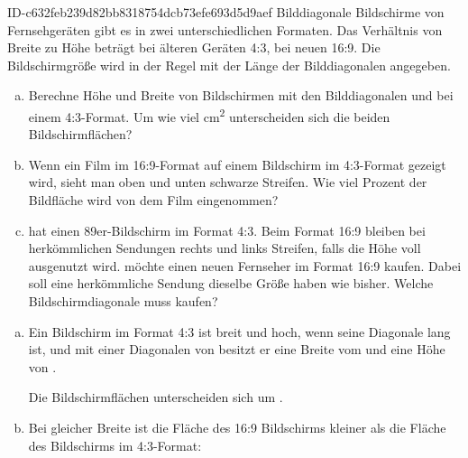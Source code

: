 \begin{exercise}
      {ID-c632feb239d82bb8318754dcb73efe693d5d9aef}
      {Bilddiagonale}
  \ifproblem\problem
    Bildschirme von Fernsehgeräten gibt es in zwei unterschiedlichen Formaten.
    Das Verhältnis von Breite zu Höhe beträgt bei älteren Geräten 4:3, bei
    neuen 16:9. Die Bildschirmgröße wird in der Regel mit der Länge der
    Bilddiagonalen angegeben.
    \begin{enumerate}[a)]
      \item Berechne Höhe und Breite von Bildschirmen mit den Bilddiagonalen
             und  bei einem 4:3-Format. Um wie viel cm\textsuperscript{2}
            unterscheiden sich die beiden Bildschirmflächen?
      \item Wenn ein Film im 16:9-Format auf einem Bildschirm im 4:3-Format gezeigt
            wird, sieht man oben und unten schwarze Streifen. Wie viel Prozent der
            Bildfläche wird von dem Film eingenommen?
      \item \xxa{} hat einen \num{89}er-Bildschirm im Format 4:3. Beim Format 16:9 bleiben
            bei herkömmlichen Sendungen rechts und links Streifen, falls die Höhe
            voll ausgenutzt wird. \xxa{} möchte einen neuen Fernseher im Format
            16:9 kaufen. Dabei soll eine herkömmliche Sendung dieselbe Größe haben
            wie bisher. Welche Bildschirmdiagonale muss \xxa{} kaufen?
    \end{enumerate}
  \fi
  \ifoutcome\outcome
    \begin{enumerate}[a)]
      \item Ein Bildschirm im Format 4:3 ist  breit und  hoch,
            wenn seine Diagonale  lang ist, und mit einer Diagonalen von
             besitzt er eine Breite vom  und eine Höhe von
            .\par
            Die Bildschirmflächen unterscheiden sich um .
      \item Bei gleicher Breite ist die Fläche des 16:9 Bildschirms 
            kleiner als die Fläche des Bildschirms im 4:3-Format:\par
            \begin{minipage}{6.25cm}
\end{minipage}
\end{enumerate}
\end{exercise}
